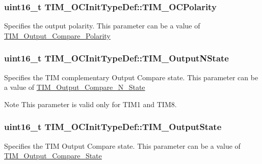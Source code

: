 \subsubsection[{\texorpdfstring{T\+I\+M\+\_\+\+O\+C\+Polarity}{TIM_OCPolarity}}]{\setlength{\rightskip}{0pt plus 5cm}uint16\+\_\+t T\+I\+M\+\_\+\+O\+C\+Init\+Type\+Def\+::\+T\+I\+M\+\_\+\+O\+C\+Polarity}\hypertarget{struct_t_i_m___o_c_init_type_def_a9ed3e2de4700d008729a916d8ba78486}{}\label{struct_t_i_m___o_c_init_type_def_a9ed3e2de4700d008729a916d8ba78486}
Specifies the output polarity. This parameter can be a value of \hyperlink{group___t_i_m___output___compare___polarity}{T\+I\+M\+\_\+\+Output\+\_\+\+Compare\+\_\+\+Polarity} 
\subsubsection[{\texorpdfstring{T\+I\+M\+\_\+\+Output\+N\+State}{TIM_OutputNState}}]{\setlength{\rightskip}{0pt plus 5cm}uint16\+\_\+t T\+I\+M\+\_\+\+O\+C\+Init\+Type\+Def\+::\+T\+I\+M\+\_\+\+Output\+N\+State}\hypertarget{struct_t_i_m___o_c_init_type_def_a933904d2f892d0b945a908b9257fe869}{}\label{struct_t_i_m___o_c_init_type_def_a933904d2f892d0b945a908b9257fe869}
Specifies the T\+IM complementary Output Compare state. This parameter can be a value of \hyperlink{group___t_i_m___output___compare___n___state}{T\+I\+M\+\_\+\+Output\+\_\+\+Compare\+\_\+\+N\+\_\+\+State} \begin{DoxyNote}{Note}
This parameter is valid only for T\+I\+M1 and T\+I\+M8. 
\end{DoxyNote}
\subsubsection[{\texorpdfstring{T\+I\+M\+\_\+\+Output\+State}{TIM_OutputState}}]{\setlength{\rightskip}{0pt plus 5cm}uint16\+\_\+t T\+I\+M\+\_\+\+O\+C\+Init\+Type\+Def\+::\+T\+I\+M\+\_\+\+Output\+State}\hypertarget{struct_t_i_m___o_c_init_type_def_a2baca9c02d214d3125635a74e8d9aee4}{}\label{struct_t_i_m___o_c_init_type_def_a2baca9c02d214d3125635a74e8d9aee4}
Specifies the T\+IM Output Compare state. This parameter can be a value of \hyperlink{group___t_i_m___output___compare___state}{T\+I\+M\+\_\+\+Output\+\_\+\+Compare\+\_\+\+State} 
